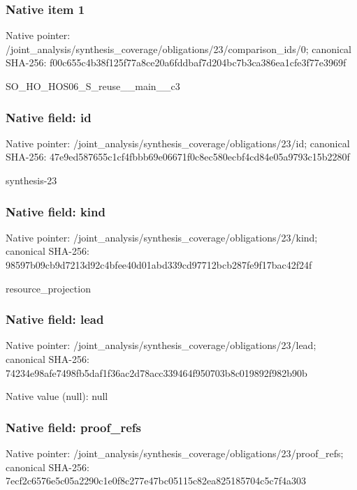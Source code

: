 \documentclass[10pt,a4paper]{article}
\begin{document}
\subsubsection{Native item 1}
Native pointer: /joint\_\allowbreak{}analysis/synthesis\_\allowbreak{}coverage/obligations/23/comparison\_\allowbreak{}ids/0; canonical SHA-256: f00c655c4b38f125f77a8ce20a6fddbaf7d204bc7b3ca386ea1cfe3f77e3969f

\begingroup\raggedright\sloppy SO\_\allowbreak{}HO\_\allowbreak{}HOS06\_\allowbreak{}S\_\allowbreak{}reuse\_\allowbreak{}\_\allowbreak{}main\_\allowbreak{}\_\allowbreak{}c3\par\endgroup

\subsubsection{Native field: id}
Native pointer: /joint\_\allowbreak{}analysis/synthesis\_\allowbreak{}coverage/obligations/23/id; canonical SHA-256: 47e9ed587655c1cf4fbbb69e06671f0c8ec580ecbf4cd84e05a9793c15b2280f

\begingroup\raggedright\sloppy synthesis-23\par\endgroup

\subsubsection{Native field: kind}
Native pointer: /joint\_\allowbreak{}analysis/synthesis\_\allowbreak{}coverage/obligations/23/kind; canonical SHA-256: 98597b09cb9d7213d92c4bfee40d01abd339cd97712bcb287fe9f17bac42f24f

\begingroup\raggedright\sloppy resource\_\allowbreak{}projection\par\endgroup

\subsubsection{Native field: lead}
Native pointer: /joint\_\allowbreak{}analysis/synthesis\_\allowbreak{}coverage/obligations/23/lead; canonical SHA-256: 74234e98afe7498fb5daf1f36ac2d78acc339464f950703b8c019892f982b90b

Native value (null): null

\subsubsection{Native field: proof\_\allowbreak{}refs}
Native pointer: /joint\_\allowbreak{}analysis/synthesis\_\allowbreak{}coverage/obligations/23/proof\_\allowbreak{}refs; canonical SHA-256: 7ecf2c6576e5c05a2290c1e0f8c277e47bc05115c82ea825185704c5c7f4a303
\end{document}
